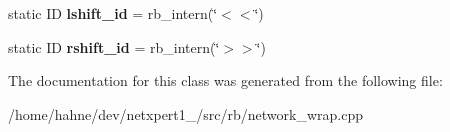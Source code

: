 \begin{DoxyCompactItemize}
\item 
static ID {\bfseries lshift\+\_\+id} = rb\+\_\+intern(\char`\"{}$<$$<$\char`\"{})\hypertarget{classswig_1_1GC__VALUE_ae40a0af3d06762857f59db14dd122c8f}{}\label{classswig_1_1GC__VALUE_ae40a0af3d06762857f59db14dd122c8f}

\item 
static ID {\bfseries rshift\+\_\+id} = rb\+\_\+intern(\char`\"{}$>$$>$\char`\"{})\hypertarget{classswig_1_1GC__VALUE_a4dba2a6c987f1688294ac3ce58925de0}{}\label{classswig_1_1GC__VALUE_a4dba2a6c987f1688294ac3ce58925de0}

\end{DoxyCompactItemize}


The documentation for this class was generated from the following file\+:\begin{DoxyCompactItemize}
\item 
/home/hahne/dev/netxpert1\+\_/src/rb/network\+\_\+wrap.\+cpp\end{DoxyCompactItemize}
